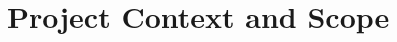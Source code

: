 \setcounter{mtc}{4} %
\setcounter{chapter}{0}
\chapter{Project Context and Scope}
\minitoc  %

\graphicspath{{Chapitre1/figures/}}
\pagestyle{fancy}
\fancyhf{}
\fancyfoot[R]{\thepage}
\renewcommand{\headrulewidth}{0.5pt}
\renewcommand{\footrulewidth}{0pt}

